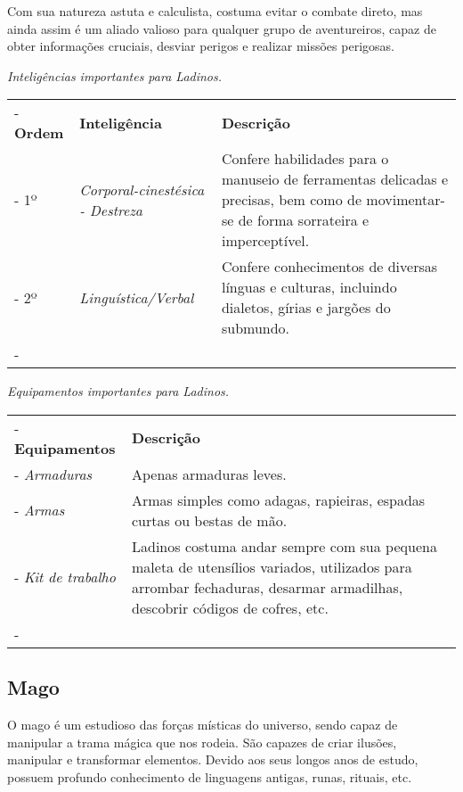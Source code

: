 Com sua natureza astuta e calculista, costuma evitar o combate direto, mas ainda assim é um aliado valioso para qualquer grupo de aventureiros, capaz de obter informações cruciais, desviar perigos e realizar missões perigosas.

\begin{table}[htb]
	\centering\smaller
	\emph{Inteligências importantes para Ladinos.} \\
	\begin{tabu} to \textwidth {|X[c 0.5]|X[1]|X[3]|} \tabucline-
		\textbf{Ordem}	& \textbf{Inteligência}	&	\textbf{Descrição}	\\ \tabucline-
		1º		& \emph{Corporal-cinestésica - Destreza}  	& Confere habilidades para o manuseio de ferramentas delicadas e precisas, bem como de movimentar-se de forma sorrateira e imperceptível. 	\\ \tabucline-
		2º		& \emph{Linguística/Verbal} & Confere conhecimentos de diversas línguas e culturas, incluindo dialetos, gírias e jargões do submundo. \\ \tabucline-
	\end{tabu}
\end{table}

\begin{table}[htb]
	\centering\smaller
	\emph{Equipamentos importantes para Ladinos.}
	\begin{tabu} to \textwidth {|X[0.5]|X[3]|} \tabucline-
		\textbf{Equipamentos}	&	\textbf{Descrição}	\\ \tabucline-
		\emph{Armaduras} & Apenas armaduras leves.	\\ \tabucline-
		\emph{Armas} & Armas simples como adagas, rapieiras, espadas curtas ou bestas de mão. \\ \tabucline-
		\emph{Kit de trabalho} & Ladinos costuma andar sempre com sua pequena maleta de utensílios variados, utilizados para arrombar fechaduras, desarmar armadilhas, descobrir códigos de cofres, etc. \\ \tabucline-
	\end{tabu}
\end{table}

\subsection*{Mago}
O mago é um estudioso das forças místicas do universo, sendo capaz de manipular a trama mágica que nos rodeia. São capazes de criar ilusões, manipular e transformar elementos. Devido aos seus longos anos de estudo, possuem profundo conhecimento de linguagens antigas, runas, rituais, etc. 

